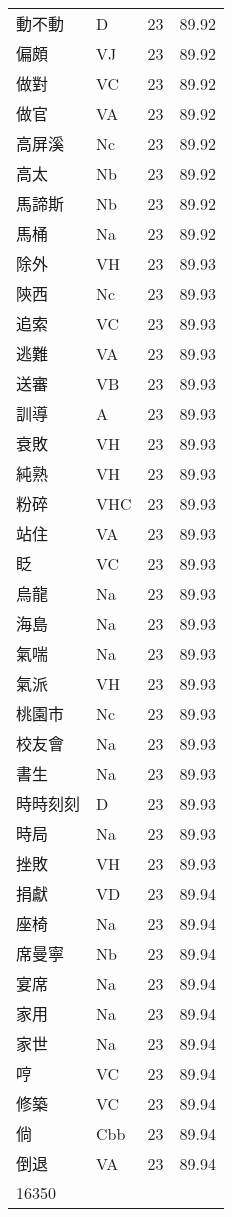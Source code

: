 \documentclass[twocolumn]{book}
\begin{document}
\begin{supertabular}{llrr}
動不動 & D & 23 &  89.92\\
偏頗 & VJ & 23 &  89.92\\
做對 & VC & 23 &  89.92\\
做官 & VA & 23 &  89.92\\
高屏溪 & Nc & 23 &  89.92\\
高太 & Nb & 23 &  89.92\\
馬諦斯 & Nb & 23 &  89.92\\
馬桶 & Na & 23 &  89.92\\
除外 & VH & 23 &  89.93\\
陝西 & Nc & 23 &  89.93\\
追索 & VC & 23 &  89.93\\
逃難 & VA & 23 &  89.93\\
送審 & VB & 23 &  89.93\\
訓導 & A & 23 &  89.93\\
衰敗 & VH & 23 &  89.93\\
純熟 & VH & 23 &  89.93\\
粉碎 & VHC & 23 &  89.93\\
站住 & VA & 23 &  89.93\\
眨 & VC & 23 &  89.93\\
烏龍 & Na & 23 &  89.93\\
海島 & Na & 23 &  89.93\\
氣喘 & Na & 23 &  89.93\\
氣派 & VH & 23 &  89.93\\
桃園市 & Nc & 23 &  89.93\\
校友會 & Na & 23 &  89.93\\
書生 & Na & 23 &  89.93\\
時時刻刻 & D & 23 &  89.93\\
時局 & Na & 23 &  89.93\\
挫敗 & VH & 23 &  89.93\\
捐獻 & VD & 23 &  89.94\\
座椅 & Na & 23 &  89.94\\
席曼寧 & Nb & 23 &  89.94\\
宴席 & Na & 23 &  89.94\\
家用 & Na & 23 &  89.94\\
家世 & Na & 23 &  89.94\\
哼 & VC & 23 &  89.94\\
修築 & VC & 23 &  89.94\\
倘 & Cbb & 23 &  89.94\\
倒退 & VA & 23 &  89.94\\
16350\\

\end{supertabular}
\end{document}
